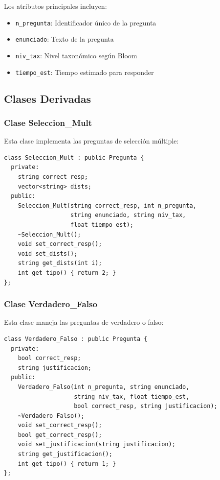 \documentclass[12pt]{article}
\begin{document}
Los atributos principales incluyen:
\begin{itemize}
    \item \texttt{n\_pregunta}: Identificador \'unico de la pregunta
    \item \texttt{enunciado}: Texto de la pregunta
    \item \texttt{niv\_tax}: Nivel taxon\'omico seg\'un Bloom
    \item \texttt{tiempo\_est}: Tiempo estimado para responder
\end{itemize}

\subsection{Clases Derivadas}

\subsubsection{Clase Seleccion\_Mult}
Esta clase implementa las preguntas de selecci\'on m\'ultiple:

\begin{lstlisting}[style=customc]
class Seleccion_Mult : public Pregunta {  
  private:
    string correct_resp;
    vector<string> dists;
  public:
    Seleccion_Mult(string correct_resp, int n_pregunta, 
                   string enunciado, string niv_tax, 
                   float tiempo_est);
    ~Seleccion_Mult();
    void set_correct_resp();
    void set_dists();
    string get_dists(int i);
    int get_tipo() { return 2; }
};
\end{lstlisting}

\subsubsection{Clase Verdadero\_Falso}
Esta clase maneja las preguntas de verdadero o falso:

\begin{lstlisting}[style=customc]
class Verdadero_Falso : public Pregunta {
  private:
    bool correct_resp;
    string justificacion;
  public:
    Verdadero_Falso(int n_pregunta, string enunciado, 
                    string niv_tax, float tiempo_est,
                    bool correct_resp, string justificacion);
    ~Verdadero_Falso();
    void set_correct_resp();
    bool get_correct_resp();
    void set_justificacion(string justificacion);
    string get_justificacion();
    int get_tipo() { return 1; }
};
\end{lstlisting}
\end{document}
